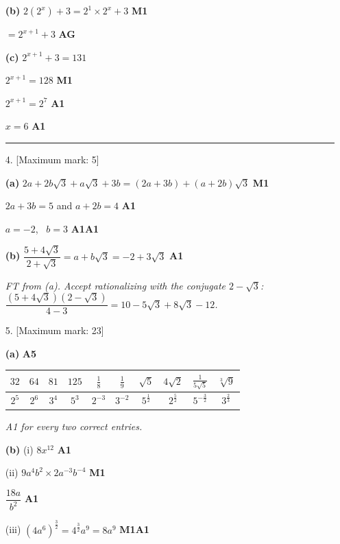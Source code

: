 \documentclass[12pt, twoside]{article}
\begin{document}
\begin{enumerate}[itemsep=0.3cm]
\textbf{(b)} $2\left(2^{x}\right) + 3 = 2^{1} \times 2^{x} + 3$ \hfill \textbf{M1}

$= 2^{x + 1} + 3$ \hfill \textbf{AG}

\textbf{(c)} $2^{x + 1} + 3 = 131$

$2^{x + 1} = 128$ \hfill \textbf{M1}

$2^{x + 1} = 2^{7}$ \hfill \textbf{A1}

$x = 6$ \hfill \textbf{A1}

\bigskip \hrule \bigskip

\item[4.] [Maximum mark: 5]

\textbf{(a)} $2a + 2b\sqrt{3} + a\sqrt{3} + 3b = (2a + 3b) + (a + 2b)\sqrt{3}$
\hfill \textbf{M1}

$2a + 3b = 5$ and $a + 2b = 4$ \hfill \textbf{A1}

$a = -2$, \ $b = 3$ \hfill \textbf{A1A1}

\textbf{(b)} $\dfrac{5 + 4\sqrt{3}}{2 + \sqrt{3}} = a + b\sqrt{3}
= -2 + 3\sqrt{3}$ \hfill \textbf{A1}

\emph{FT from (a). Accept rationalizing with the conjugate $2 - \sqrt{3}$:
$\dfrac{(5 + 4\sqrt{3})(2 - \sqrt{3})}{4 - 3} = 10 - 5\sqrt{3} +
8\sqrt{3} - 12$.}

\newpage

\item[5.] [Maximum mark: 23]

\textbf{(a)} \hfill \textbf{A5}

\begin{tabular}{|c|c|c|c|c|c|c|c|c|c|}
\hline
$32$ & $64$ & $81$ & $125$ & $\frac{1}{8}$ & $\frac{1}{9}$ & $\sqrt{5}$ & $4\sqrt{2}$ & $\frac{1}{5\sqrt{5}}$ & $\sqrt[3]{9}$ \\
\hline
$2^{5}$ & $2^{6}$ & $3^{4}$ & $5^{3}$ & $2^{-3}$ & $3^{-2}$ & $5^{\frac{1}{2}}$ & $2^{\frac{5}{2}}$ & $5^{-\frac{3}{2}}$ & $3^{\frac{2}{3}}$ \\
\hline
\end{tabular}

\emph{A1 for every two correct entries.}

\textbf{(b)} (i) $8x^{12}$ \hfill \textbf{A1}

(ii) $9a^{4}b^{2} \times 2a^{-3}b^{-4}$ \hfill \textbf{M1}

$\dfrac{18a}{b^{2}}$ \hfill \textbf{A1}

(iii) $\left(4a^{6}\right)^{\frac{3}{2}} = 4^{\frac{3}{2}}a^{9} = 8a^{9}$
\hfill \textbf{M1A1}


\end{enumerate}
\end{document}

